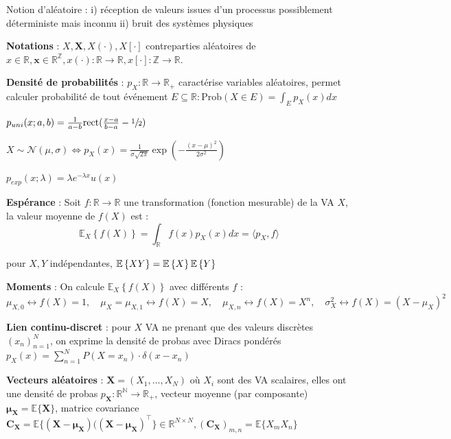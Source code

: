 Notion d'aléatoire : i) réception de valeurs issues d'un processus possiblement déterministe mais inconnu ii) bruit des systèmes physiques

\textbf{Notations} : $X, \mathbf{X}, X(\cdot), X[\cdot]$ contreparties aléatoires de $x\in\mathbb{R}, \mathbf{x}\in\mathbb{R^Z}, x(\cdot) :\mathbb{R}\rightarrow\mathbb{R}, x[\cdot]:\mathbb{Z}\rightarrow\mathbb{R}$.

\textbf{Densité de probabilités} : $p_X:\mathbb{R}\rightarrow\mathbb{R_+}$ caractérise variables aléatoires, permet calculer probabilité de tout événement $E\subseteq\mathbb{R} : \text{Prob}(X\in E) = \int_E p_X(x)dx$

\begin{myitemize}
    \item $p_{uni}(x; a,b) = \frac{1}{a-b}\text{rect}(\frac{x-a}{b-a}-\sfrac{1}{2})$
    \item $X \sim \mathcal{N}(\mu,\sigma) \Leftrightarrow p_X(x) = \frac{1}{\sigma\sqrt{2\pi}}\exp({-\frac{(x-\mu)^2}{2\sigma^2}})$
    \item $p_{exp}(x;\lambda) = \lambda e^{-\lambda x} u(x)$
\end{myitemize}

\textbf{Espérance} : Soit $f:\mathbb{R}\rightarrow\mathbb{R}$ une transformation (fonction mesurable) de la VA $X$, la valeur moyenne de $f(X)$ est :
\begin{equation*}
    \mathbb{E}_X\left\{f(X)\right\} = \int_\mathbb{R} f(x)p_X(x)dx = \langle p_X, f \rangle
\end{equation*}

pour $X,Y$ indépendantes, $\mathbb{E}\left\{XY\right\}=\mathbb{E}\left\{X\right\}\mathbb{E}\left\{Y\right\}$

\textbf{Moments} : On calcule $\mathbb{E}_X\left\{f(X)\right\}$ avec différents $f$ : $\mu_{X,0} \leftrightarrow f(X) = 1,\quad \mu_X = \mu_{X,1} \leftrightarrow f(X) = X,\quad \mu_{X,n}\leftrightarrow f(X) = X^n,\quad \sigma_X^2\leftrightarrow f(X)=(X-\mu_X)^2$

\textbf{Lien continu-discret} : pour $X$ VA ne prenant que des valeurs discrètes $(x_n)_{n=1}^N$, on exprime la densité de probas avec Diracs pondérés $p_X(x) = \sum_{n=1}^N P(X=x_n) \cdot \delta(x-x_n)$

\textbf{Vecteurs aléatoires} : $\textbf{X}=(X_1,\dots,X_N)$ où $X_i$ sont des VA scalaires, elles ont une densité de probas $p_\mathbf{X} : \mathbb{R^N}\rightarrow\mathbb{R}_+$, vecteur moyenne (par composante) $\mathbf{\mu_X} = \mathbb{E}\{\mathbf{X}\}$, matrice covariance $\mathbf{C_X} = \mathbb{E}\{(\mathbf{X}-\mathbf{\mu_X})((\mathbf{X}-\mathbf{\mu_X})^\intercal\}\in\mathbb{R}^{N\times N}, (\mathbf{C_X})_{m,n} = \mathbb{E}\{X_mX_n\}$

